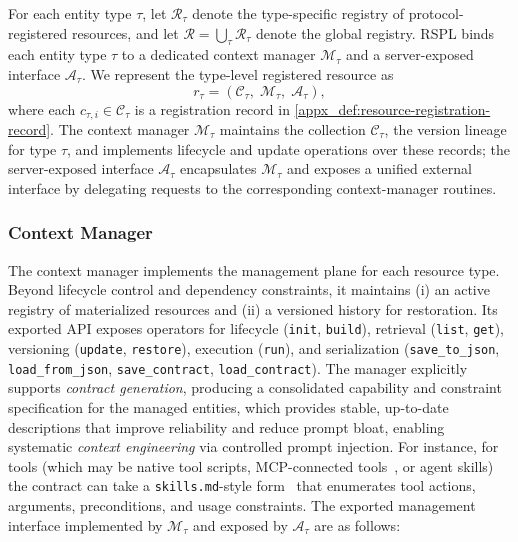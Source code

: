 \begin{definition}
\label{appx_def:protocol-registered-resource}
For each entity type $\tau$, let $\mathcal{R}_\tau$ denote the type-specific registry of protocol-registered resources, and let $\mathcal{R} = \bigcup_{\tau}\mathcal{R}_\tau$ denote the global registry. RSPL binds each entity type $\tau$ to a dedicated context manager $\mathcal{M}_\tau$ and a server-exposed interface $\mathcal{A}_\tau$. We represent the type-level registered resource as
\begin{equation}
r_{\tau} = (\mathcal{C}_\tau,\; \mathcal{M}_\tau,\; \mathcal{A}_\tau),
\end{equation}
where each $c_{\tau,i} \in \mathcal{C}_\tau$ is a registration record in \cref{appx_def:resource-registration-record}. The context manager $\mathcal{M}_\tau$ maintains the collection $\mathcal{C}_\tau$, the version lineage for type $\tau$, and implements lifecycle and update operations over these records; the server-exposed interface $\mathcal{A}_\tau$ encapsulates $\mathcal{M}_\tau$ and exposes a unified external interface by delegating requests to the corresponding context-manager routines.
\end{definition}

\subsubsection{Context Manager}
\label{appx_sec:context-manager}

The context manager implements the management plane for each resource type. Beyond lifecycle control and dependency constraints, it maintains (i) an active registry of materialized resources and (ii) a versioned history for restoration. Its exported API exposes operators for lifecycle (\texttt{init}, \texttt{build}), retrieval (\texttt{list}, \texttt{get}), versioning (\texttt{update}, \texttt{restore}), execution (\texttt{run}), and serialization (\texttt{save\_to\_json}, \texttt{load\_from\_json}, \texttt{save\_contract}, \texttt{load\_contract}). The manager explicitly supports \emph{contract generation}, producing a consolidated capability and constraint specification for the managed entities, which provides stable, up-to-date descriptions that improve reliability and reduce prompt bloat, enabling systematic \emph{context engineering} via controlled prompt injection. For instance, for tools (which may be native tool scripts, MCP-connected tools~\citep{anthropic2025}, or agent skills) the contract can take a \texttt{skills.md}-style form~\citep{anthropic2025agentskills} that enumerates tool actions, arguments, preconditions, and usage constraints. The exported management interface implemented by $\mathcal{M}_\tau$ and exposed by $\mathcal{A}_\tau$ are as follows:

